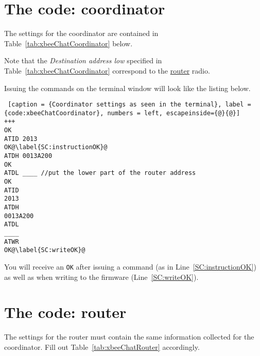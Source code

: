 \section{The code: coordinator}

The settings for the coordinator are contained in Table~\ref{tab:xbeeChatCoordinator} below.

\begin{table}[htbp]
	\centering
	\caption{XBee coordinator settings for simple chat}
	\label{tab:xbeeChatCoordinator}
\end{table}

Note that the \emph{Destination address low} specified in Table~\ref{tab:xbeeChatCoordinator} correspond to the \underline{router} radio.

Issuing the commands on the terminal window will look like the listing below.

\begin{lstlisting} [caption = {Coordinator settings as seen in the terminal}, label = {code:xbeeChatCoordinator}, numbers = left, escapeinside={@}{@}]
+++
OK
ATID 2013
OK@\label{SC:instructionOK}@
ATDH 0013A200
OK
ATDL ____ //put the lower part of the router address
OK
ATID
2013
ATDH
0013A200
ATDL
____
ATWR
OK@\label{SC:writeOK}@
\end{lstlisting}

You will receive an \texttt{OK} after issuing a command (as in Line~\ref{SC:instructionOK}) as well as when writing to the firmware (Line~\ref{SC:writeOK}).

\section{The code: router}

The settings for the router must contain the same information collected for the coordinator. Fill out Table~\ref{tab:xbeeChatRouter} accordingly.

